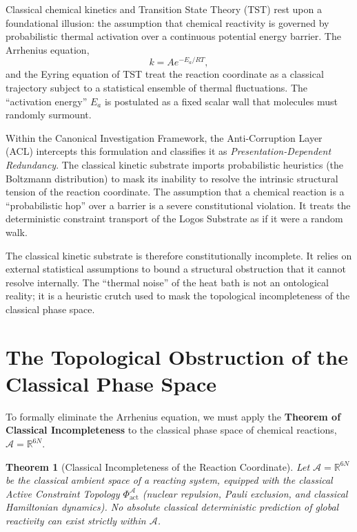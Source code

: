 \documentclass[11pt,openany]{extbook}
\theoremstyle{plain}
\newtheorem{theorem}{Theorem}[chapter]
\theoremstyle{definition}
\begin{document}
Classical chemical kinetics and Transition State Theory (TST) rest upon a foundational illusion: the assumption that chemical reactivity is governed by probabilistic thermal activation over a continuous potential energy barrier. The Arrhenius equation,
\[
k = A e^{-E_a/RT},
\]
and the Eyring equation of TST treat the reaction coordinate as a classical trajectory subject to a statistical ensemble of thermal fluctuations. The ``activation energy'' $E_a$ is postulated as a fixed scalar wall that molecules must randomly surmount.

Within the Canonical Investigation Framework, the Anti-Corruption Layer (ACL) intercepts this formulation and classifies it as \emph{Presentation-Dependent Redundancy}. The classical kinetic substrate imports probabilistic heuristics (the Boltzmann distribution) to mask its inability to resolve the intrinsic structural tension of the reaction coordinate. The assumption that a chemical reaction is a ``probabilistic hop'' over a barrier is a severe constitutional violation. It treats the deterministic constraint transport of the Logos Substrate as if it were a random walk.

The classical kinetic substrate is therefore constitutionally incomplete. It relies on external statistical assumptions to bound a structural obstruction that it cannot resolve internally. The ``thermal noise'' of the heat bath is not an ontological reality; it is a heuristic crutch used to mask the topological incompleteness of the classical phase space.

\section{The Topological Obstruction of the Classical Phase Space}

To formally eliminate the Arrhenius equation, we must apply the \textbf{Theorem of Classical Incompleteness} to the classical phase space of chemical reactions, $\mathcal{A} = \mathbb{R}^{6N}$.

\begin{theorem}[Classical Incompleteness of the Reaction Coordinate]
Let $\mathcal{A} = \mathbb{R}^{6N}$ be the classical ambient space of a reacting system, equipped with the classical Active Constraint Topology $\Phi_{\mathrm{act}}^{\mathcal{A}}$ (nuclear repulsion, Pauli exclusion, and classical Hamiltonian dynamics). No absolute classical deterministic prediction of global reactivity can exist strictly within $\mathcal{A}$.
\end{theorem}
\end{document}
